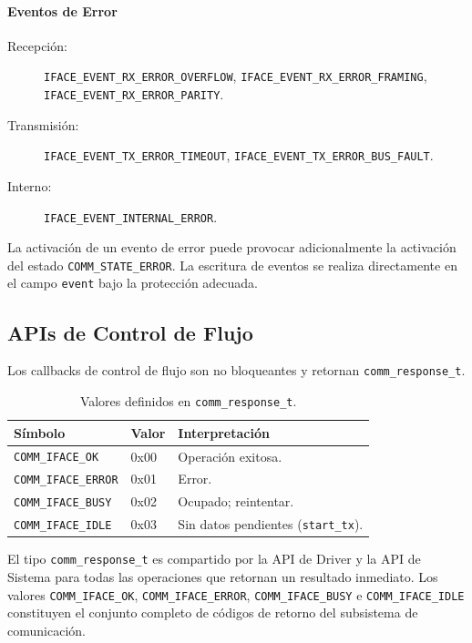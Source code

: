 \paragraph{Eventos de Error}

\begin{description}
    \item[Recepción:] \texttt{IFACE\_EVENT\_RX\_ERROR\_OVERFLOW},
          \texttt{IFACE\_EVENT\_RX\_ERROR\_FRAMING},
          \texttt{IFACE\_EVENT\_RX\_ERROR\_PARITY}.
    \item[Transmisión:] \texttt{IFACE\_EVENT\_TX\_ERROR\_TIMEOUT},
          \texttt{IFACE\_EVENT\_TX\_ERROR\_BUS\_FAULT}.
    \item[Interno:] \texttt{IFACE\_EVENT\_INTERNAL\_ERROR}.
\end{description}

La activación de un evento de error puede provocar adicionalmente la activación del estado \texttt{COMM\_STATE\_ERROR}. La escritura de eventos se realiza directamente en el campo \texttt{event} bajo la protección adecuada.

\subsection{APIs de Control de Flujo}
\label{subsec:api-control-flujo}

Los callbacks de control de flujo son no bloqueantes y retornan \texttt{comm\_response\_t}.

\begin{table}[htbp]
    \centering
    \caption{Valores definidos en \texttt{comm\_response\_t}.}
    \label{tab:com-response}
    \begin{tabular}{llp{7cm}}
        \toprule
        \textbf{Símbolo} & \textbf{Valor} & \textbf{Interpretación} \\
        \midrule
        \texttt{COMM\_IFACE\_OK}    & 0x00 & Operación exitosa. \\
        \texttt{COMM\_IFACE\_ERROR} & 0x01 & Error. \\
        \texttt{COMM\_IFACE\_BUSY}  & 0x02 & Ocupado; reintentar. \\
        \texttt{COMM\_IFACE\_IDLE}  & 0x03 & Sin datos pendientes (\texttt{start\_tx}). \\
        \bottomrule
    \end{tabular}
\end{table}

El tipo \texttt{comm\_response\_t} es compartido por la API de Driver y la API de Sistema para todas las operaciones que retornan un resultado inmediato. Los valores \texttt{COMM\_IFACE\_OK}, \texttt{COMM\_IFACE\_ERROR}, \texttt{COMM\_IFACE\_BUSY} e \texttt{COMM\_IFACE\_IDLE} constituyen el conjunto completo de códigos de retorno del subsistema de comunicación.

